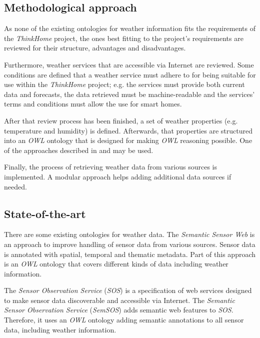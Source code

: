 \subsection*{Methodological approach}
As none of the existing ontologies for weather information fits the requirements of the \textit{ThinkHome} project, the ones best fitting to the project's requirements are reviewed for their structure, advantages and disadvantages.

Furthermore, weather services that are accessible via Internet are reviewed.
Some conditions are defined that a weather service must adhere to for being suitable for use within the \textit{ThinkHome} project;
e.g. the services must provide both current data and forecasts, the data retrieved must be machine-readable and the services' terms and conditions must allow the use for smart homes.

After that review process has been finished, a set of weather properties (e.g. temperature and humidity) is defined.
Afterwards, that properties are structured into an \textit{OWL} ontology that is designed for making \textit{OWL} reasoning possible.
One of the approaches described in \cite{Ontology101} and \cite{SoftwareEngineeringOntology} may be used.

Finally, the process of retrieving weather data from various sources is implemented. A modular approach helps adding additional data sources if needed.

\subsection*{State-of-the-art}

There are some existing ontologies for weather data. The \textit{Semantic Sensor Web} \cite{SemanticSensorWeb} is an approach to improve handling of sensor data from various sources.
Sensor data is annotated with spatial, temporal and thematic metadata. Part of this approach is an \textit{OWL} ontology that covers different kinds of data including weather information.

The \textit{Sensor Observation Service} (\textit{SOS}) \cite{SOS} is a specification of web services designed to make sensor data discoverable and accessible via Internet.
The \textit{Semantic Sensor Observation Service} (\textit{SemSOS}) \cite{SemSOS} adds semantic web features to \textit{SOS}.
Therefore, it uses an \textit{OWL} ontology adding semantic annotations to all sensor data, including weather information.

